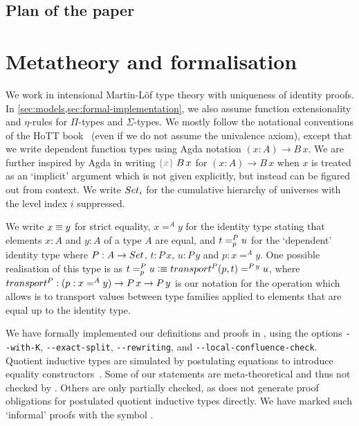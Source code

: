 \documentclass[a4paper,UKenglish,numberwithinsect,cleveref,thm-restate]{lipics-v2021}
\begin{document}
\subsection{Plan of the paper}

\section{Metatheory and formalisation} \label{sec:meta}

We work in intensional Martin-L\"of type theory with uniqueness of identity proofs. In \cref{sec:models,sec:formal-implementation}, we also assume function extensionality and $\eta$-rules for $\Pi$-types and $\Sigma$-types.
%
We mostly follow the notational conventions of the HoTT book~\cite{UFP2013} (even if we do not assume the univalence axiom), except that we write dependent function types using Agda notation $(x : A) \to B\,x$.
%
We are further inspired by Agda in writing $\implicit{x}\;B\,x$ for $(x : A) \to B\,x$ when $x$ is treated as an `implicit' argument which is not given explicitly, but instead can be figured out from context.
We write $\Set_i$ for the cumulative hierarchy of universes with the level index $i$ suppressed.

We write $x \jdeq y$ for strict equality, $x =^{A} y$ for the identity type stating that elements $x : A$ and $y : A$ of a type $A$ are equal, and $\dpath{P}{p}{t}{u}$ for the `dependent' identity type where $P : A \to \Set$, $t : P\,x$, $u : P\,y$ and $p : x =^A y$. One possible realisation of this type is as $t =^{P}_{p} u \defeq \transfib{P}{p}{t} =^{P\,y} u$, where $\transfibf{P} : (p : x =^A y) \to P\,x \to P\,y$ is our notation for the operation which allows is to transport values between type families applied to elements that are equal up to the identity type.
%

We have formally implemented our definitions and proofs in \Agda, using the options \texttt{-{}-with-K}, \texttt{-{}-exact-split}, \texttt{-{}-rewriting}, and \texttt{-{}-local-confluence-check}.
Quotient inductive types are simulated by postulating equations to introduce equality constructors~\cite{Licata2011}.
Some of our statements are meta-theoretical and thus not checked by \Agda.
Others are only partially checked, as \Agda does not generate proof obligations for postulated quotient inductive types directly.
We have marked such `informal' proofs with the symbol \resizebox*{!}{\baselineskip}{\textdbend}.
\end{document}

